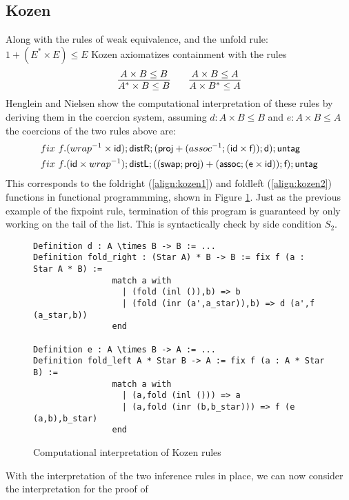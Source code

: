 \documentclass[a4paper,UKenglish,cleveref, autoref, thm-restate]{lipics-v2021}
\begin{document}
\subsection{Kozen}
Along with the rules of weak equivalence, and the unfold rule: $1 + (E^* \times E) \leq E$ Kozen axiomatizes containment with the rules
\begin{displaymath}
\infer{A^* \times B \leq B}{A \times B \leq B} \qquad \infer{A \times B^* \leq A}{A \times B \leq A}
\end{displaymath}
Henglein and Nielsen show the  computational interpretation of these rules by deriving them in the coercion system, assuming $d : A \times B \leq B $ and $e : A \times B \leq A $ the coercions of the two rules above are:
\begin{align}
&\fix~f.(\dslcominv{wrap}\times \dslcom{id}); \dslcom{distR};(\dslcom{proj} + (\dslcominv{assoc};(\dslcom{id} \times \dslcom{f}));\dslcom{d});\dslcom{untag}\label{align:kozen1}\\
&\fix~f.( \dslcom{id} \times \dslcominv{wrap}); \dslcom{distL};((\dslcom{swap};\dslcom{proj}) + (\dslcom{assoc};(\dslcom{e} \times \dslcom{id}));\dslcom{f});\dslcom{untag}\label{align:kozen2}
\end{align}
This corresponds to the  \textsf{foldright} (\ref{align:kozen1}) and \textsf{foldleft} (\ref{align:kozen2}) functions in functional programmming, shown in Figure \ref{figure:kozen}. Just as the previous example of the fixpoint rule, termination of this program is guaranteed by only working on the tail of the list. This is syntactically check by side condition $S_2$.
\begin{figure}\label{figure:kozen}
\caption{Computational interpretation of Kozen rules}
  \centering
  \begin{verbatim}
Definition d : A \times B -> B := ...
Definition fold_right : (Star A) * B -> B := fix f (a : Star A * B) := 
                match a with 
                  | (fold (inl ()),b) => b 
                  | (fold (inr (a',a_star)),b) => d (a',f (a_star,b))
                end

Definition e : A \times B -> A := ...
Definition fold_left A * Star B -> A := fix f (a : A * Star B) := 
                match a with 
                  | (a,fold (inl ())) => a
                  | (a,fold (inr (b,b_star))) => f (e (a,b),b_star)
                end
\end{verbatim}
\end{figure}
With the interpretation of the two inference rules in place, we can now consider the interpretation for the proof of
\end{document}
